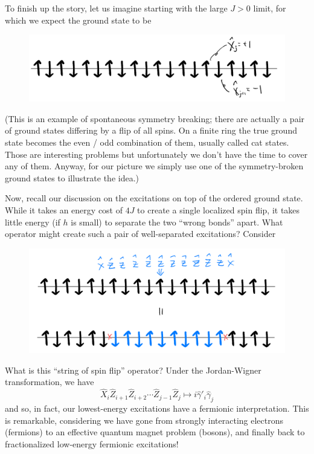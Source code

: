 To finish up the story, let us imagine starting with the large $J>0$ limit, for which we expect the ground state to be
\begin{figure}[H]
    \centering
    \includegraphics[width=\textwidth]{jupyterbook/data/fig/lec26-fig06.png}
\end{figure}
(This is an example of spontaneous symmetry breaking; there are actually a pair of ground states differing by a flip of all spins. On a finite ring the true ground state becomes the even / odd combination of them, usually called cat states. Those are interesting problems but unfortunately we don't have the time to cover any of them. Anyway, for our picture we simply use one of the symmetry-broken ground states to illustrate the idea.)

Now, recall our discussion on the excitations on top of the ordered ground state. While it takes an energy cost of $4J$ to create a single localized spin flip, it takes little energy (if $h$ is small) to separate the two ``wrong bonds'' apart. What operator might create such a pair of well-separated excitations? Consider
\begin{figure}[H]
    \centering
    \includegraphics[width=\textwidth]{jupyterbook/data/fig/lec26-fig07.png}
\end{figure}
What is this ``string of spin flip'' operator? Under the Jordan-Wigner transformation, we have
\[ \hat{X}_i\hat{Z}_{i+1}\hat{Z}_{i+2}\cdots \hat{Z}_{j-1}\hat{Z}_j\mapsto i\hat{\gamma}'_i\hat{\gamma}_j\]
and so, in fact, our lowest-energy excitations have a fermionic interpretation. This is remarkable, considering we have gone from strongly interacting electrons (fermions) to an effective quantum magnet problem (bosons), and finally back to fractionalized low-energy fermionic excitations!

